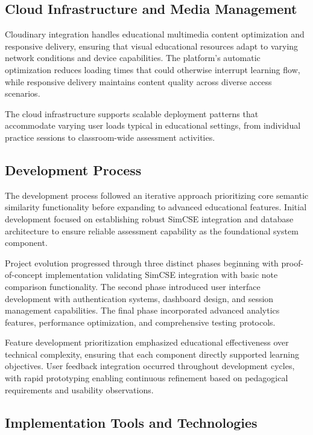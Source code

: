 {\subsection{Cloud Infrastructure and Media Management}

Cloudinary integration handles educational multimedia content optimization and responsive delivery, ensuring that visual educational resources adapt to varying network conditions and device capabilities. The platform's automatic optimization reduces loading times that could otherwise interrupt learning flow, while responsive delivery maintains content quality across diverse access scenarios.

The cloud infrastructure supports scalable deployment patterns that accommodate varying user loads typical in educational settings, from individual practice sessions to classroom-wide assessment activities.

\subsection{Development Process}

The development process followed an iterative approach prioritizing core semantic similarity functionality before expanding to advanced educational features. Initial development focused on establishing robust SimCSE integration and database architecture to ensure reliable assessment capability as the foundational system component.

Project evolution progressed through three distinct phases beginning with proof-of-concept implementation validating SimCSE integration with basic note comparison functionality. The second phase introduced user interface development with authentication systems, dashboard design, and session management capabilities. The final phase incorporated advanced analytics features, performance optimization, and comprehensive testing protocols.

Feature development prioritization emphasized educational effectiveness over technical complexity, ensuring that each component directly supported learning objectives. User feedback integration occurred throughout development cycles, with rapid prototyping enabling continuous refinement based on pedagogical requirements and usability observations.

\subsection{Implementation Tools and Technologies}

}
